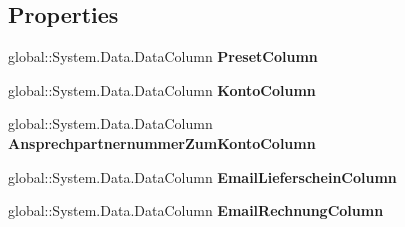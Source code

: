 \subsection*{Properties}
\begin{DoxyCompactItemize}
\item 
global\+::\+System.\+Data.\+Data\+Column {\bfseries Preset\+Column}\hypertarget{class_products_1_1_data_1_1ds_sage_1_1cpm__kontaktemail_data_table_a77792936f16ce971a65ff216cce88dcb}{}\label{class_products_1_1_data_1_1ds_sage_1_1cpm__kontaktemail_data_table_a77792936f16ce971a65ff216cce88dcb}

\item 
global\+::\+System.\+Data.\+Data\+Column {\bfseries Konto\+Column}\hypertarget{class_products_1_1_data_1_1ds_sage_1_1cpm__kontaktemail_data_table_a2d260f6b05ed4a8c8fd8e181cf2eeb19}{}\label{class_products_1_1_data_1_1ds_sage_1_1cpm__kontaktemail_data_table_a2d260f6b05ed4a8c8fd8e181cf2eeb19}

\item 
global\+::\+System.\+Data.\+Data\+Column {\bfseries Ansprechpartnernummer\+Zum\+Konto\+Column}\hypertarget{class_products_1_1_data_1_1ds_sage_1_1cpm__kontaktemail_data_table_af65d9454059c0b4e9f8fa889427b7f07}{}\label{class_products_1_1_data_1_1ds_sage_1_1cpm__kontaktemail_data_table_af65d9454059c0b4e9f8fa889427b7f07}

\item 
global\+::\+System.\+Data.\+Data\+Column {\bfseries Email\+Lieferschein\+Column}\hypertarget{class_products_1_1_data_1_1ds_sage_1_1cpm__kontaktemail_data_table_aa20036c13762ec73ef94b64f556250f6}{}\label{class_products_1_1_data_1_1ds_sage_1_1cpm__kontaktemail_data_table_aa20036c13762ec73ef94b64f556250f6}

\item 
global\+::\+System.\+Data.\+Data\+Column {\bfseries Email\+Rechnung\+Column}\hypertarget{class_products_1_1_data_1_1ds_sage_1_1cpm__kontaktemail_data_table_a2dd792d0a60f779eaba6488e9d5808b2}{}\label{class_products_1_1_data_1_1ds_sage_1_1cpm__kontaktemail_data_table_a2dd792d0a60f779eaba6488e9d5808b2}


\end{DoxyCompactItemize}
